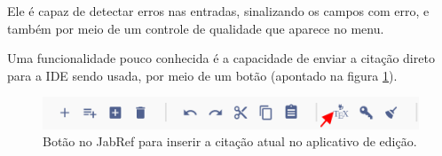Ele é capaz de detectar erros nas entradas, sinalizando os campos com erro, e também por meio de um controle de qualidade que aparece no menu. 

Uma funcionalidade pouco conhecida é a capacidade de enviar a citação direto para a IDE sendo usada, por meio de um botão (apontado na figura \ref{fig:jabref-push}).
   

\begin{figure}
    \centering
    \includegraphics[width=0.7\linewidth]{"Images/jabref push"}
    \caption{Botão no JabRef para inserir a citação atual no aplicativo de edição.}
    \label{fig:jabref-push}
\end{figure}






